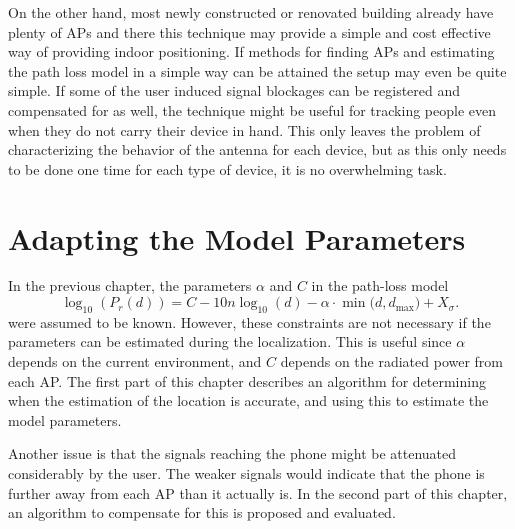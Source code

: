\documentclass{LTHthesis}
\begin{document}
On the other hand, most newly constructed or renovated building already have plenty of APs and there this technique may provide a simple and cost effective way of providing indoor positioning. If methods for finding APs and estimating the path loss model in a simple way can be attained the setup may even be quite simple. If some of the user induced signal blockages can be registered and compensated for as well, the technique might be useful for tracking people even when they do not carry their device in hand. This only leaves the problem of characterizing the behavior of the antenna for each device, but as this only needs to be done one time for each type of device, it is no overwhelming task.        
%
\chapter{Adapting the Model Parameters} %
%

In the previous chapter, the parameters $\alpha$ and $C$ in the path-loss model 
%
\begin{equation}
\log_{10}({P_r(d)})=C-10n\log_{10}(d) - \alpha\cdot\min({d, d_{\text{max}})}+ X_\sigma.
\label{equation:model_to_adapt}
\end{equation}
%
were assumed to be known. However, these constraints are not necessary if the parameters can be estimated during the localization. This is useful since $\alpha$ depends on the current environment, and $C$ depends on the radiated power from each AP. The first part of this chapter describes an algorithm for determining when the estimation of the location is accurate, and using this to estimate the model parameters. 

Another issue is that the signals reaching the phone might be attenuated considerably by the user. The weaker signals would indicate that the phone is further away from each AP than it actually is. In the second part of this chapter, an algorithm to compensate for this is proposed and evaluated.

%
\end{document}
